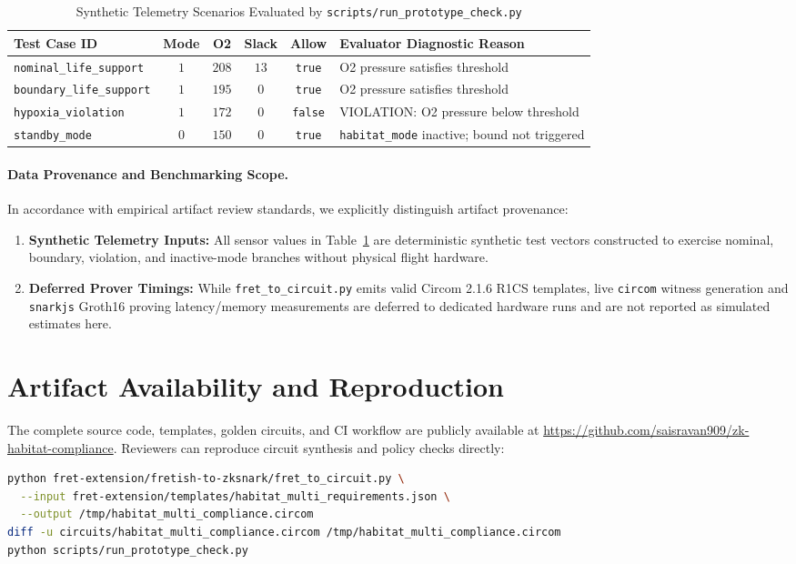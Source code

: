 \documentclass[runningheads]{llncs}
\begin{document}
\begin{table}[t]
\centering
\caption{Synthetic Telemetry Scenarios Evaluated by \texttt{scripts/run\_prototype\_check.py}}
\label{tab:synth_cases}
\scriptsize
\begin{tabular}{l c c c c l}
\toprule
\textbf{Test Case ID} & \textbf{Mode} & \textbf{O2} & \textbf{Slack} & \textbf{Allow} & \textbf{Evaluator Diagnostic Reason} \\
\midrule
\texttt{nominal\_life\_support} & $1$ & $208$ & $13$ & \texttt{true} & O2 pressure satisfies threshold \\
\texttt{boundary\_life\_support} & $1$ & $195$ & $0$ & \texttt{true} & O2 pressure satisfies threshold \\
\texttt{hypoxia\_violation} & $1$ & $172$ & $0$ & \texttt{false} & VIOLATION: O2 pressure below threshold \\
\texttt{standby\_mode} & $0$ & $150$ & $0$ & \texttt{true} & \texttt{habitat\_mode} inactive; bound not triggered \\
\bottomrule
\end{tabular}
\end{table}

\paragraph{Data Provenance and Benchmarking Scope.}
In accordance with empirical artifact review standards, we explicitly distinguish artifact provenance:
\begin{enumerate}
    \item \textbf{Synthetic Telemetry Inputs:} All sensor values in Table~\ref{tab:synth_cases} are deterministic synthetic test vectors constructed to exercise nominal, boundary, violation, and inactive-mode branches without physical flight hardware.
    \item \textbf{Deferred Prover Timings:} While \texttt{fret\_to\_circuit.py} emits valid Circom 2.1.6 R1CS templates, live \texttt{circom} witness generation and \texttt{snarkjs} Groth16 proving latency/memory measurements are deferred to dedicated hardware runs and are not reported as simulated estimates here.
\end{enumerate}

\section{Artifact Availability and Reproduction}
The complete source code, templates, golden circuits, and CI workflow are publicly available at \url{https://github.com/saisravan909/zk-habitat-compliance}. Reviewers can reproduce circuit synthesis and policy checks directly:
\begin{lstlisting}[language=bash]
python fret-extension/fretish-to-zksnark/fret_to_circuit.py \
  --input fret-extension/templates/habitat_multi_requirements.json \
  --output /tmp/habitat_multi_compliance.circom
diff -u circuits/habitat_multi_compliance.circom /tmp/habitat_multi_compliance.circom
python scripts/run_prototype_check.py
\end{lstlisting}
\end{document}
